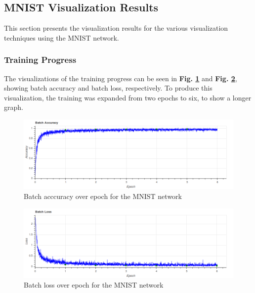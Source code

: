 \subsection{MNIST Visualization Results} \label{mnist-vis-results}

This section presents the visualization results for the various visualization techniques using the MNIST network.

\subsubsection{Training Progress}

The visualizations of the training progress can be seen in \textbf{Fig. \ref{mnist:accuracy}} and \textbf{Fig. \ref{mnist:loss}}, showing batch accuracy and batch loss, respectively. To produce this visualization, the training was expanded from two epochs to six, to show a longer graph.


\begin{figure}
    \centering
    \includegraphics[width=1\textwidth]{fig/results/training_progress/accuracy.png}
    \caption{Batch acccuracy over epoch for the MNIST network}
    \label{mnist:accuracy}
\end{figure}

\begin{figure}
    \centering
    \includegraphics[width=1\textwidth]{fig/results/training_progress/loss.png}
    \caption{Batch loss over epoch for the MNIST network}
    \label{mnist:loss}
\end{figure}

